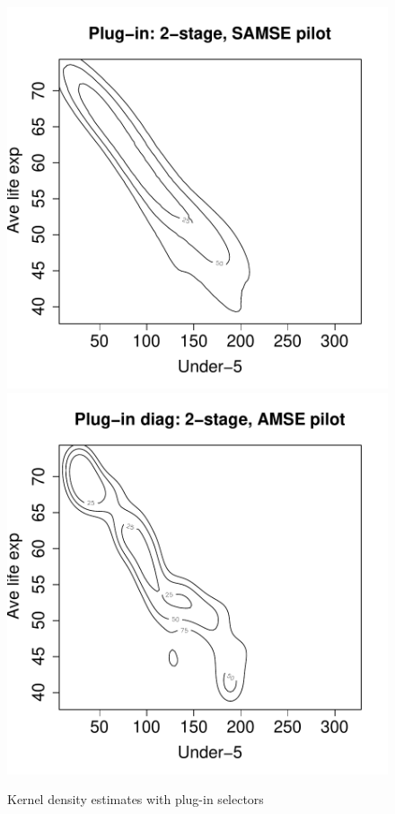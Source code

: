 \documentclass[a4paper,11pt]{article}
\begin{document}
\begin{figure}[!ht]
\centering
\includegraphics{kde-007}
\includegraphics{kde-008}
\caption{Kernel density estimates with plug-in selectors}
\label{fig:pi}
\end{figure}
\end{document}
